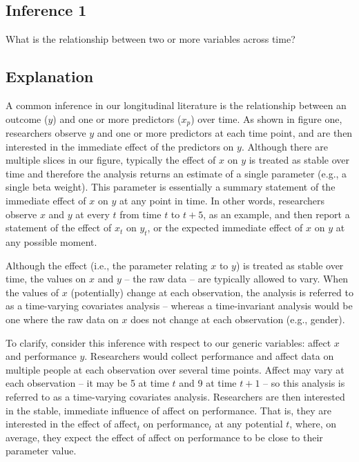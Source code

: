 \documentclass[english,,man]{apa6}
\theoremstyle{definition}
\theoremstyle{definition}
\theoremstyle{definition}
\theoremstyle{remark}
\begin{document}
\hypertarget{inference-1-3}{%
\subsection{Inference 1}\label{inference-1-3}}

What is the relationship between two or more variables across time?

\hypertarget{explanation}{%
\subsection{Explanation}\label{explanation}}

A common inference in our longitudinal literature is the relationship
between an outcome (\(y\)) and one or more predictors (\(x_{p}\)) over
time. As shown in figure one, researchers observe \(y\) and one or more
predictors at each time point, and are then interested in the immediate
effect of the predictors on \(y\). Although there are multiple slices in
our figure, typically the effect of \(x\) on \(y\) is treated as stable
over time and therefore the analysis returns an estimate of a single
parameter (e.g., a single beta weight). This parameter is essentially a
summary statement of the immediate effect of \(x\) on \(y\) at any point
in time. In other words, researchers observe \(x\) and \(y\) at every
\(t\) from time \(t\) to \(t + 5\), as an example, and then report a
statement of the effect of \(x_{t}\) on \(y_{t}\), or the expected
immediate effect of \(x\) on \(y\) at any possible moment.

Although the effect (i.e., the parameter relating \(x\) to \(y\)) is
treated as stable over time, the values on \(x\) and \(y\) -- the raw
data -- are typically allowed to vary. When the values of \(x\)
(potentially) change at each observation, the analysis is referred to as
a time-varying covariates analysis -- whereas a time-invariant analysis
would be one where the raw data on \(x\) does not change at each
observation (e.g., gender).

To clarify, consider this inference with respect to our generic
variables: affect \(x\) and performance \(y\). Researchers would collect
performance and affect data on multiple people at each observation over
several time points. Affect may vary at each observation -- it may be 5
at time \(t\) and 9 at time \(t + 1\) -- so this analysis is referred to
as a time-varying covariates analysis. Researchers are then interested
in the stable, immediate influence of affect on performance. That is,
they are interested in the effect of affect\(_{t}\) on
performance\(_{t}\) at any potential \(t\), where, on average, they
expect the effect of affect on performance to be close to their
parameter value.
\end{document}
